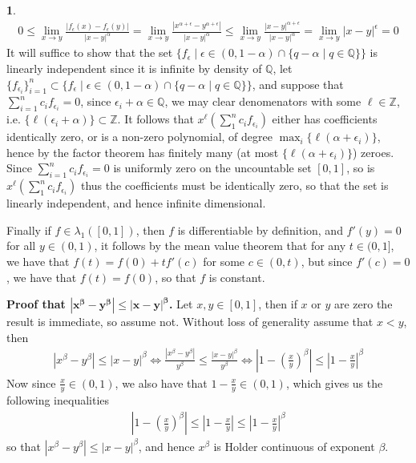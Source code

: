 \documentclass[10.5pt]{article}
\theoremstyle{definition}
\newtheorem{pb}{}
\newcommand{\set}[1]{\{#1\}}
\newcommand{\abs}[1]{\left\vert#1\right\vert}
\newcommand{\tor}{\text{ or }}
\begin{document}
\begin{pb}
            \begin{align*}
                0 \leq \lim_{x \to y}\frac{\abs{f_\epsilon(x) - f_\epsilon(y)}}{\abs{x-y}^\alpha} = \lim_{x \to y}\frac{\abs{x^{\alpha + \epsilon} - y^{\alpha + \epsilon}}}{\abs{x-y}^\alpha} \leq \lim_{x \to y}\frac{\abs{x - y}^{\alpha + \epsilon}}{\abs{x-y}^\alpha} = \lim_{x \to y}\abs{x-y}^\epsilon = 0
            \end{align*}
            It will suffice to show that the set \(\set{f_\epsilon \mid \epsilon \in (0,1-\alpha) \cap \set{q - \alpha \mid q \in \mathbb{Q}}}\) is linearly independent since it is infinite by density of \(\mathbb{Q}\), let \(\set{f_{\epsilon_i}}_{i=1}^n \subset \set{f_\epsilon \mid \epsilon \in (0,1-\alpha) \cap \set{q - \alpha \mid q \in \mathbb{Q}}}\), and suppose that \(\sum_{i=1}^n c_i f_{\epsilon_i} = 0\), since \(\epsilon_i + \alpha \in \mathbb{Q}\), we may clear denomenators with some \(\ell \in \mathbb{Z}\), i.e. \(\set{\ell(\epsilon_i + \alpha)} \subset \mathbb{Z}\). It follows that \(x^\ell(\sum_1^n c_i f_{\epsilon_i})\) either has coefficients identically zero, or is a non-zero polynomial, of degree \(\max_i\set{\ell (\alpha + \epsilon_i)}\), hence by the factor theorem has finitely many (at most \(\set{\ell (\alpha + \epsilon_i)}\)) zeroes. Since \(\sum_{i=1}^n c_i f_{\epsilon_i} = 0\) is uniformly zero on the uncountable set \([0,1]\), so is \(x^\ell(\sum_1^n c_i f_{\epsilon_i})\) thus the coefficients must be identically zero, so that the set is linearly independent, and hence infinite dimensional.

            Finally if \(f \in \lambda_1([0,1])\), then \(f\) is differentiable by definition, and \(f'(y) = 0\) for all \(y \in (0,1)\), it follows by the mean value theorem that for any \(t \in (0,1]\), we have that \(f(t) = f(0) + tf'(c)\) for some \(c \in (0,t)\), but since \(f'(c) = 0\), we have that \(f(t) = f(0)\), so that \(f\) is constant.

            \textbf{Proof that \(\mathbf{\abs{x^\beta - y^\beta} \leq \abs{x-y}^\beta}\).} Let \(x,y \in [0,1]\), then if \(x \tor y\) are zero the result is immediate, so assume not. Without loss of generality assume that \(x < y\), then
            \begin{align*}
                \abs{x^\beta - y^\beta} \leq \abs{x - y}^\beta \iff \frac{\abs{x^\beta - y^\beta}}{y^\beta} \leq \frac{\abs{x - y}^\beta}{y^\beta} \iff \abs{1 - \left(\frac{x}{y}\right)^\beta} \leq \abs{1 - \frac{x}{y}}^\beta
            \end{align*}
            Now since \(\frac{x}{y} \in (0,1)\), we also have that \(1 - \frac{x}{y} \in (0,1)\), which gives us the following inequalities
            \begin{align*}
                \abs{1 - \left(\frac{x}{y}\right)^\beta} \leq \abs{1 - \frac{x}{y}} \leq \abs{1 - \frac{x}{y}}^\beta
            \end{align*}
            so that \(\abs{x^\beta - y^\beta} \leq \abs{x - y}^\beta\), and hence \(x^\beta\) is Holder continuous of exponent \(\beta\).
        \end{pb}
\end{document}
